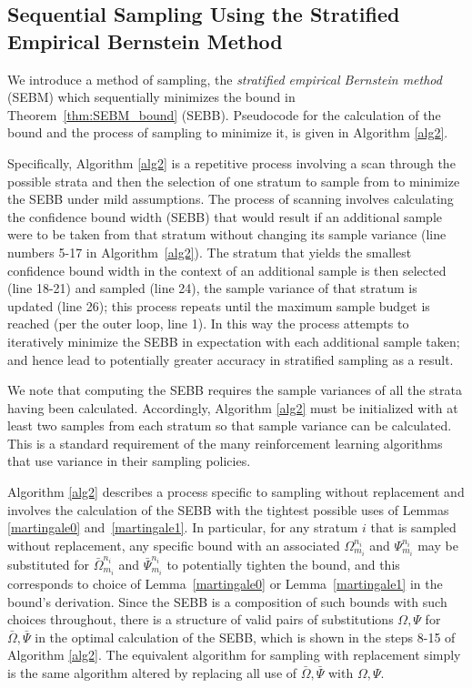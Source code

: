 \documentclass[]{interact}
\theoremstyle{plain}%
\theoremstyle{definition}
\theoremstyle{remark}
\begin{document}
\subsection{Sequential Sampling Using the Stratified Empirical Bernstein Method}\label{sec:SEBMalgorithm}
We introduce a method of sampling, the \textit{stratified empirical Bernstein method} (SEBM) which sequentially minimizes the bound in Theorem~\ref{thm:SEBM_bound} (SEBB).
Pseudocode for the calculation of the bound and the process of sampling to minimize it, is given in Algorithm \ref{alg2}.

Specifically, Algorithm \ref{alg2} is a repetitive process involving a scan through the possible strata and then the selection of one stratum to sample from to minimize the SEBB under mild assumptions.
The process of scanning involves calculating the confidence bound width (SEBB) that would result if an additional sample were to be taken from that stratum without changing its sample variance (line numbers 5-17 in Algorithm~\ref{alg2}).
The stratum that yields the smallest confidence bound width in the context of an additional sample is then selected (line 18-21) and sampled (line 24), the sample variance of that stratum is updated (line 26); 
this process repeats until the maximum sample budget is reached (per the outer loop, line 1).
In this way the process attempts to iteratively minimize the SEBB in expectation with each additional sample taken; and hence lead to potentially greater accuracy in stratified sampling as a result.

We note that computing the SEBB requires the sample variances of all the strata having been calculated.
Accordingly, Algorithm \ref{alg2} must be initialized with at least two samples from each stratum so that sample variance can be calculated.
This is a standard requirement of the many reinforcement learning algorithms that use variance in their sampling policies.

Algorithm \ref{alg2} describes a process specific to sampling without replacement and involves the calculation of the SEBB with the tightest possible uses of Lemmas \ref{martingale0} and~\ref{martingale1}.
In particular, for any stratum $i$ that is sampled without replacement, any specific bound with an associated $\Omega_{m_i}^{n_i}$ and $\Psi_{m_i}^{n_i}$ may be substituted for $\bar{\Omega}_{m_i}^{n_i}$ and $\bar{\Psi}_{m_i}^{n_i}$ to potentially tighten the bound, and this corresponds to choice of Lemma~\ref{martingale0} or Lemma~\ref{martingale1} in the bound's derivation. 
Since the SEBB is a composition of such bounds with such choices throughout, there is a structure of valid pairs of substitutions $\Omega,\Psi$ for $\bar{\Omega},\bar{\Psi}$ in the optimal calculation of the SEBB, which is shown in the steps 8-15 of Algorithm \ref{alg2}.
The equivalent algorithm for sampling with replacement simply is the same algorithm altered by replacing all use of $\bar{\Omega},\bar{\Psi}$ with $\Omega,\Psi$.
\end{document}

